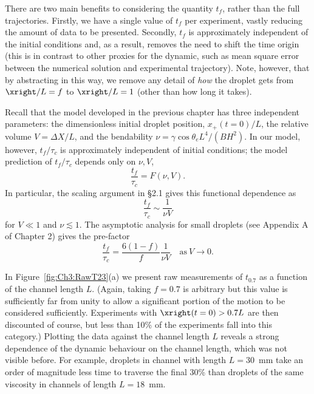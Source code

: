 There are two main benefits to considering the quantity $t_f$, rather than the full trajectories. Firstly, we have a single value of $t_f$ per experiment, vastly reducing the amount of data to be presented. Secondly, $t_f$ is approximately independent of the initial conditions and, as a result, removes the need to shift the time origin (this is in contrast to other proxies for the dynamic, such as mean square error between the numerical solution and experimental trajectory). Note, however, that by abstracting in this way, we remove any detail of \textit{how} the droplet gets from $\xright / L = f$ to $\xright / L = 1$ (other than how long it takes).

Recall that the model developed in the previous chapter has three independent parameters: the dimensionless initial droplet position, $x_+(t = 0)/L$, the relative volume $V = \Delta X/ L$, and the bendability $\nu = \gamma \cos \theta_e L^4/(B H^2)$. In our model, however, $t_f/\tau_c$ is approximately independent of initial conditions; the model prediction of $t_f/\tau_c$ depends only on $\nu, V$,
\begin{equation}\label{E:Ch3:ScalingFunctionalForm}
\frac{t_{f}}{\tau_c} = F(\nu, V).
\end{equation}
In particular, the scaling argument in \S2.1 gives this functional dependence as
\begin{equation}\label{E:Ch3:ScalingFunctionalForm_scaling}
\frac{t_{f}}{\tau_c} \sim \frac{1}{\nu V}
\end{equation}
for $V \ll 1$ and $\nu \lesssim 1$. The asymptotic analysis for small droplets (see Appendix A of Chapter 2) gives the pre-factor
\begin{equation}\label{E:Ch3:ScalingFunctionalForm_asymptotic}
\frac{t_{f}}{\tau_c}  = \frac{6(1-f)}{f} \frac{1}{\nu V} \quad \text{as}~ V \to 0.
\end{equation}

In Figure~\ref{fig:Ch3:RawT23}(a) we present raw measurements of $t_{0.7}$ as a function of the channel length $L$. (Again, taking $f = 0.7$ is arbitrary but this value is sufficiently far from unity to allow a significant portion of the motion to be considered sufficiently. Experiments with $\xright(t =0) > 0.7L$ are then discounted of course, but less than 10\% of the experiments fall into this category.) Plotting the data against the channel length $L$ reveals a strong dependence of the dynamic behaviour on the channel length, which was not visible before. For example, droplets in channel with length $L = 30$~mm take an order of magnitude less time to traverse the final 30\% than droplets of the same viscosity in channels of length $L = 18$~mm.


